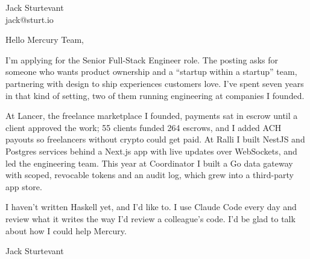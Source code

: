 \documentclass[11pt]{article}
\begin{document}
\raggedright

{\namefont\fontsize{20pt}{24pt}\selectfont Jack Sturtevant}\\[-0.3em]
jack@sturt.io

\vspace{1.2em}

Hello Mercury Team,

I'm applying for the Senior Full-Stack Engineer role. The posting asks for someone who wants product ownership and a ``startup within a startup'' team, partnering with design to ship experiences customers love. I've spent seven years in that kind of setting, two of them running engineering at companies I founded.

At Lancer, the freelance marketplace I founded, payments sat in escrow until a client approved the work; 55 clients funded 264 escrows, and I added ACH payouts so freelancers without crypto could get paid. At Ralli I built NestJS and Postgres services behind a Next.js app with live updates over WebSockets, and led the engineering team. This year at Coordinator I built a Go data gateway with scoped, revocable tokens and an audit log, which grew into a third-party app store.

I haven't written Haskell yet, and I'd like to. I use Claude Code every day and review what it writes the way I'd review a colleague's code. I'd be glad to talk about how I could help Mercury.

\vspace{0.6em}
Jack Sturtevant
\end{document}
